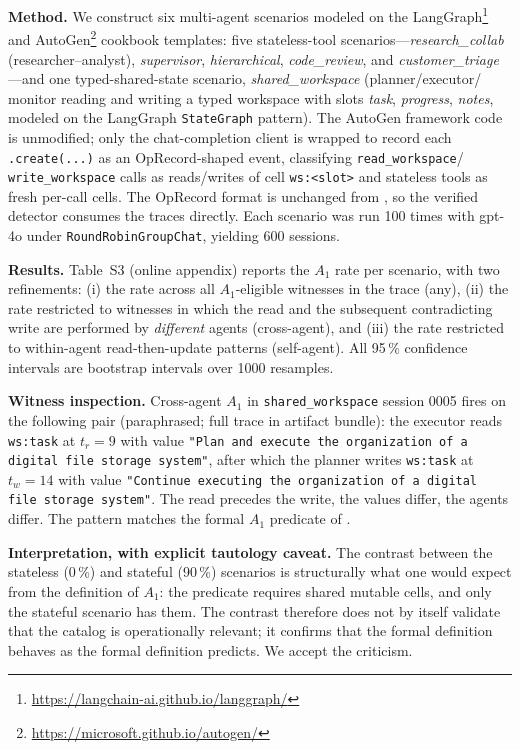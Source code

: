 \documentclass[journal,compsoc,10pt]{IEEEtran}
\theoremstyle{definition}
\theoremstyle{remark}
\begin{document}
\medskip
\noindent\textbf{Method.}
We construct six multi-agent scenarios modeled on the
LangGraph\footnote{\url{https://langchain-ai.github.io/langgraph/}}
and AutoGen\footnote{\url{https://microsoft.github.io/autogen/}}
cookbook templates: five stateless-tool scenarios---\emph{research\_collab}
(researcher--analyst), \emph{supervisor}, \emph{hierarchical},
\emph{code\_review}, and \emph{customer\_triage}---and one
typed-shared-state scenario, \emph{shared\_workspace} (planner/executor/%
monitor reading and writing a typed workspace with slots \emph{task},
\emph{progress}, \emph{notes}, modeled on the LangGraph \texttt{StateGraph}
pattern). The AutoGen framework code is unmodified; only the
chat-completion client is wrapped to record each \texttt{.create(...)} as an
OpRecord-shaped event, classifying \texttt{read\_workspace}/%
\texttt{write\_workspace} calls as reads/writes of cell \texttt{ws:<slot>}
and stateless tools as fresh per-call cells. The OpRecord format is
unchanged from , so the verified detector consumes the
traces directly. Each scenario was run 100 times with gpt-4o under
\texttt{RoundRobinGroupChat}, yielding 600 sessions.

\medskip
\noindent\textbf{Results.}
Table~S3 (online appendix) reports the $A_1$ rate per scenario, with
two refinements: (i) the rate across all $A_1$-eligible
witnesses in the trace (any), (ii) the rate restricted to
witnesses in which the read and the subsequent contradicting
write are performed by \emph{different} agents (cross-agent),
and (iii) the rate restricted to within-agent read-then-update
patterns (self-agent). All 95\,\% confidence intervals are
bootstrap intervals over 1000 resamples.


\medskip
\noindent\textbf{Witness inspection.}
Cross-agent $A_1$ in \texttt{shared\_workspace} session 0005
fires on the following pair (paraphrased; full trace in
artifact bundle):
the executor reads \texttt{ws:task} at $t_r = 9$ with value
\texttt{"Plan and execute the organization of a digital file
storage system"}, after which the planner writes
\texttt{ws:task} at $t_w = 14$ with value
\texttt{"Continue executing the organization of a digital file
storage system"}. The read precedes the write, the values
differ, the agents differ. The pattern matches the formal
$A_1$ predicate of .

\medskip
\noindent\textbf{Interpretation, with explicit tautology
caveat.}
The contrast
between the stateless (0\,\%) and stateful (90\,\%) scenarios
is structurally what one would expect from the definition of
$A_1$: the predicate requires shared mutable cells, and only
the stateful scenario has them. The contrast therefore does
not by itself validate that the catalog is operationally
relevant; it confirms that the formal definition behaves as
the formal definition predicts. We accept the criticism.
\end{document}
